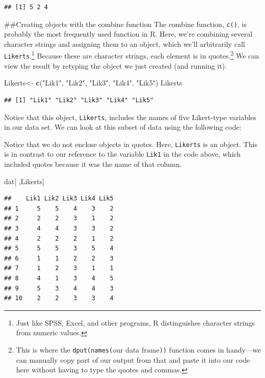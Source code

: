 \documentclass[]{tufte-handout}
\newenvironment{Shaded}{}{}
\newcommand{\KeywordTok}[1]{\textcolor[rgb]{0.00,0.44,0.13}{\textbf{#1}}}
\newcommand{\NormalTok}[1]{#1}
\newcommand{\StringTok}[1]{\textcolor[rgb]{0.25,0.44,0.63}{#1}}
\begin{document}
\begin{verbatim}
## [1] 5 2 4
\end{verbatim}

\#\#Creating objects with the combine function The combine function,
\texttt{c()}, is probably the most frequently used function in R. Here,
we're combining several character strings and assigning them to an
object, which we'll arbitrarily call \texttt{Likerts}.\footnote{Just
  like SPSS, Excel, and other programs, R distinguishes character
  strings from numeric values.} Because these are character strings,
each element is in quotes.\footnote{This is where the
  \texttt{dput(names(}our data frame\texttt{))} function comes in
  handy---we can manually copy part of our output from that and paste it
  into our code here without having to type the quotes and commas.} We
can view the result by retyping the object we just created (and running
it).

\begin{Shaded}
\begin{Highlighting}[]
\NormalTok{Likerts<-}\StringTok{ }\KeywordTok{c}\NormalTok{(}\StringTok{"Lik1"}\NormalTok{, }\StringTok{"Lik2"}\NormalTok{, }\StringTok{"Lik3"}\NormalTok{, }\StringTok{"Lik4"}\NormalTok{, }\StringTok{"Lik5"}\NormalTok{)}
\NormalTok{Likerts}
\end{Highlighting}
\end{Shaded}

\begin{verbatim}
## [1] "Lik1" "Lik2" "Lik3" "Lik4" "Lik5"
\end{verbatim}

Notice that this object, \texttt{Likerts}, includes the names of five
Likert-type variables in our data set. We can look at this subset of
data using the following code:

\begin{marginfigure}
Notice that we do not enclose objects in quotes. Here, \texttt{Likerts}
is an object. This is in contrast to our reference to the variable
\texttt{Lik1} in the code above, which included quotes because it was
the name of that column.
\end{marginfigure}

\begin{Shaded}
\begin{Highlighting}[]
\NormalTok{dat[ ,Likerts]}
\end{Highlighting}
\end{Shaded}

\begin{verbatim}
##    Lik1 Lik2 Lik3 Lik4 Lik5
## 1     5    5    4    3    2
## 2     2    2    3    1    2
## 3     4    4    3    3    2
## 4     2    2    2    1    2
## 5     5    5    3    5    4
## 6     1    1    2    2    3
## 7     1    2    3    1    1
## 8     4    1    3    4    5
## 9     5    3    4    4    3
## 10    2    2    3    3    4
\end{verbatim}
\end{document}

